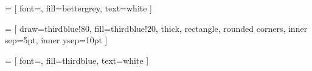  =     [  font=\sffamily\large, 
                    fill=bettergrey,
                    text=white
                    ]

 = [       draw={thirdblue!80},
                    fill={thirdblue!20},
                    thick,
                    rectangle, 
                    rounded corners, 
                    inner sep=5pt, 
                    inner ysep=10pt
                    ]
                    
 = [  font=\sffamily\large,
                    fill={thirdblue},
                    text=white
                    ]
\newcommand{\numbertable}[1]{
                        \begin{figure*}
                        \begin{tikzpicture}
                        \node [table] (box){%
                            \begin{minipage}{\textwidth}
                            \centering
                            \vspace{5pt}
                            

                        #1
                            \end{minipage}
                        };
                        \node[tabletitle, right=30pt] at (box.north west) {Number Crunching};
                        \node[recipe-logo, right=5pt] at (box.north west) {\calc}; 
                        \end{tikzpicture}
                        \end{figure*}
    
}                    
\newcommand{\margininbox}[3]{
                        \begin{marginfigure}
                        \begin{tikzpicture}
                        \node [name-dest] (box){%
                            \begin{minipage}{0.95\textwidth}
                            \vspace{5pt}
                            \normalsize{#2}
                            \end{minipage}
                        };
                        \node[fancytitle, right=30pt] at (box.north west) {#1};
                        \node[logbook-logo, right = 5pt] at(box.north west) {\protect#3};
                        \end{tikzpicture}
                        \end{marginfigure}
}



